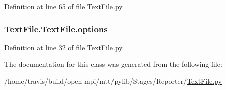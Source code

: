 Definition at line 65 of file Text\-File.\-py.

\hypertarget{class_text_file_1_1_text_file_a064e68c6dc686f22e4d83dee541c2c0d}{
\subsubsection[{options}]{\setlength{\rightskip}{0pt plus 5cm}Text\-File.\-Text\-File.\-options}}\label{class_text_file_1_1_text_file_a064e68c6dc686f22e4d83dee541c2c0d}


Definition at line 32 of file Text\-File.\-py.



The documentation for this class was generated from the following file\-:\begin{DoxyCompactItemize}
\item 
/home/travis/build/open-\/mpi/mtt/pylib/\-Stages/\-Reporter/\hyperlink{_text_file_8py}{Text\-File.\-py}\end{DoxyCompactItemize}
